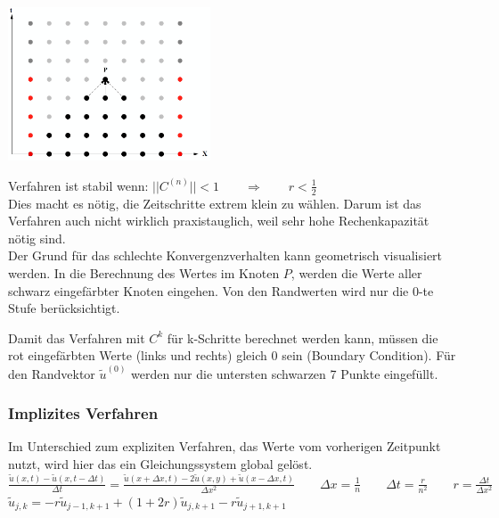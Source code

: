 \begin{minipage}{6cm}
\includegraphics[width=6cm]{Content/Numerik/KonvExplizit.png}
\end{minipage}
\hfill
\begin{minipage}{12cm}
Verfahren ist stabil wenn: $||C^{(n)}|| < 1 \qquad \Rightarrow\qquad r < \frac{1}{2}$\\

Dies macht es nötig, die Zeitschritte extrem klein zu wählen. Darum ist das Verfahren auch nicht wirklich praxistauglich, weil sehr hohe Rechenkapazität nötig sind.\\

Der Grund für das schlechte Konvergenzverhalten kann geometrisch visualisiert werden. In die Berechnung des Wertes im Knoten $P$, werden die Werte aller schwarz eingefärbter Knoten eingehen. Von den Randwerten wird nur die 0-te Stufe berücksichtigt.
\end{minipage}
Damit das Verfahren mit $C^k$ für k-Schritte berechnet werden kann, müssen die
rot eingefärbten Werte (links und rechts) gleich 0 sein (Boundary Condition).
Für den Randvektor $\tilde{u}^{(0)}$ werden nur die untersten schwarzen 7 Punkte
eingefüllt.

\subsubsection{Implizites Verfahren}
Im Unterschied zum expliziten Verfahren, das Werte vom vorherigen Zeitpunkt nutzt, wird hier das ein Gleichungssystem global gelöst.\\

$\boxed{\frac{\tilde{u}(x,t) - \tilde{u}(x,t -\Delta t)}{\Delta t} =
\frac{\tilde{u}(x+\Delta x, t)-2\tilde{u}(x,y) + \tilde{u}( x - \Delta x, t )} {\Delta x^2}}
 \qquad \Delta x=\frac{1}{n} \qquad \Delta t=\frac{r}{n^2} \qquad \boxed{r=\frac{\Delta
t}{\Delta x^2}}$\\

$ \tilde{u}_{j,k} = - r \tilde{u}_{j-1,k+1} + (1+2r)\tilde{u}_{j,k+1} - r \tilde{u}_{j+1,k+1}$

